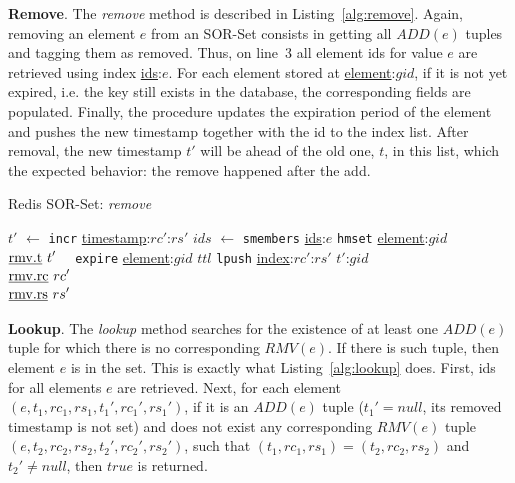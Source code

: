 \textbf{Remove}. The \textit{remove} method is described in
Listing~\ref{alg:remove}. Again, removing an element $e$ from an SOR-Set
consists in getting all $ADD(e)$ tuples and tagging them as removed. Thus, on
line~3 all element ids for value $e$ are retrieved using index
\underline{ids}:$e$. For each element stored at \underline{element}:$gid$,
if it is not yet expired, i.e. the key still exists in the database, the
corresponding fields are populated. Finally, the procedure updates the
expiration period of the element and pushes the new timestamp together with the
id to the index list. After removal, the new timestamp $t'$ will be ahead of the
old one, $t$, in this list, which the expected behavior: the remove happened
after the add.

\begin{algorithm}[t]
    \small{
    \caption{Redis SOR-Set: \textit{remove}}
    \label{alg:remove}
    \centering
    \begin{algorithmic}[1]
 	    \State $t'$ $\gets$ \texttt{incr} \underline{timestamp}:$rc'$:$rs'$
 	    \State $ids$ $\gets$ \texttt{smembers} \underline{ids}:$e$
 	        \State \texttt{hmset} \underline{element}:$gid$ $\begin{aligned}[t]
                                                              & \text{\underline{rmv.t} } t' \\[-2pt]
                                                              & \text{\underline{rmv.rc} } rc' \\[-2pt]
                                                              & \text{\underline{rmv.rs} } rs'
                                                              \end{aligned}$
            \State \texttt{expire} \underline{element}:$gid$ $ttl$
            \State \texttt{lpush} \underline{index}:$rc'$:$rs'$ $t'$:$gid$
 	      \EndIf
 	    \EndFor
 	  \EndProcedure
	\end{algorithmic}
    }
\end{algorithm}

\textbf{Lookup}. The \textit{lookup} method searches for the existence of at
least one $ADD(e)$ tuple for which there is no corresponding $RMV(e)$. If there
is such tuple, then element $e$ is in the set. This is exactly what
Listing~\ref{alg:lookup} does. First, ids for all elements $e$ are retrieved.
Next, for each element $(e, t_1, rc_1, rs_1, t_1', rc_1', rs_1')$, if it is an
$ADD(e)$ tuple ($t_{1}' = null$, its removed timestamp is not set) and does not
exist any corresponding $RMV(e)$ tuple $(e, t_2, rc_2, rs_2, t_2', rc_2',
rs_2')$, such that $(t_1, rc_1, rs_1) = (t_2, rc_2, rs_2)$ and $t_2' \neq
null$, then $true$ is returned.

